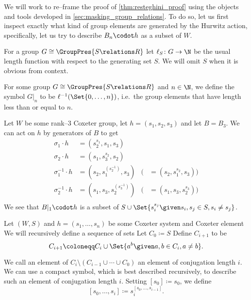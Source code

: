 We will work to re--frame the proof of \cref{thm:resteghini_proof} using the objects and tools developed in \cref{sec:masking_group_relations}.
To do so, let us first inspect exactly what kind of group elements are generated by the Hurwitz action, specifically, let us try to describe $B_n \codot h$ as a subset of $W$.

\begin{definition}
	For a group $G \cong \GroupPres{S \relations R}$ let $\ell_S \colon G \to \N$ be the usual length function with respect to the generating set $S$.
	We will omit $S$ when it is obvious from context.
\end{definition}
\begin{definition}
	For some group $G \cong \GroupPres{S \relations R}$ and $n \in \N$, we define the symbol $G|_n$ to be $\ell^{-1}(\Set{0, \ldots, n})$, i.e.~the group elements that have length less than or equal to $n$.
\end{definition}
\begin{example}
	Let $W$ be some rank--3 Coxeter group, let $h = (s_1,s_2,s_3)$ and let $B = B_3$.
	We can act on $h$ by generators of $B$ to get
	\begin{align*}
		\sigma_1 \cdot h      & = (s_2^{s_1}, s_1, s_3)                                                    \\
		\sigma_2 \cdot h      & = (s_1, s_3^{s_2}, s_2)                                                    \\
		\sigma_1^{-1} \cdot h & =  (s_2, s_1^{\left(s_2^{-1}\right)}, s_3) & ( & = (s_2, s_1^{s_2}, s_3) ) \\
		\sigma_2^{-1} \cdot h & = (s_1, s_3, s_2^{\left(s_3^{-1}\right)})  & ( & = (s_1, s_3, s_2^{s_3}))  \\
	\end{align*}
	We see that $B|_1 \codot h$ is a subset of $S \cup \Set{s_i^{s_j} \given s_i,s_j \in S, s_i \neq s_j} $.
	\label{ex:rank_3_hurwitz_action}
\end{example}

\begin{definition}
	Let $(W,S)$ and $h = (s_1, \ldots, s_n)$ be some Coxeter system and Coxeter element
	We will recursively define a sequence of sets
	Let $C_0 \coloneqq S$
	Define  $C_{i+1}$ to be
	\[
		C_{i+1} \coloneqq C_i \cup \Set{a^{b} \given a,b \in C_i, a \neq b}
		.\]
\end{definition}
\begin{definition}
	We call an element of $C_i \setminus (C_{i-1} \cup \cdots \cup C_0)$ an element of conjugation length $i$.
	We can use a compact symbol, which is best described recursively, to describe such an element of conjugation length $i$.
	Setting $[s_0] \coloneqq s_0$, we define
	\[
		[s_0, \ldots, s_i] \coloneqq s_i^{[s_0, \ldots, s_{i-1}]}
		.\]
\end{definition}

